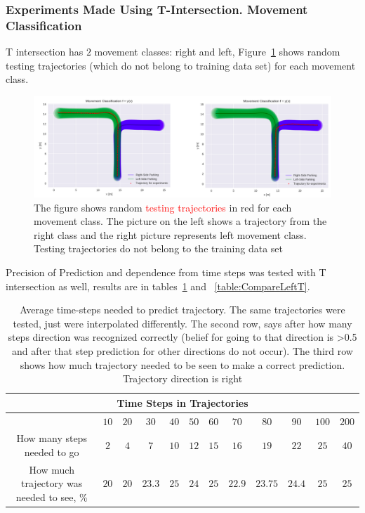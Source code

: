 \subsubsection{Experiments Made Using T-Intersection. Movement Classification}

T intersection has $2$ movement classes: right and left, Figure~\ref{fig:MovClassesT} shows random testing trajectories (which do not belong to training data set) for each movement class.

\begin{figure}[H]
	\centering  	
	\includegraphics[width=13cm]{img/rightleftT.png}
	\caption{The figure shows random \textcolor{red}{testing trajectories} in red for each movement class. The picture on the left shows a trajectory from the right class and the right picture represents left movement class. Testing trajectories do not belong to the training data set}
	\label{fig:MovClassesT}    
\end{figure}

Precision of Prediction and dependence from time steps was tested with T intersection as well, results are in tables~\ref{table:CompareRightT} and ~\ref{table:CompareLeftT}.

\begin{table}[h!]
	\centering
	\begin{tabular}{|c|c|c|c|c|c|c|c|c|c|c|c|} 
		\hline
		\multicolumn{12}{|c|}{Time Steps in Trajectories} \\
		\hline
		& $10$ & $20$ & $30$ & $40$ & $50$ & $60$ & $70$ & $80$ & $90$ & $100$ & $200$ \\ [0.5ex] 
		\hline\hline
		How many steps needed to go               & $2$  & $4$  & $7$    & $10$ & $12$ & $15$  &  $16$   & $19$     & $22$   & $25$ & $40$ \\ [1ex]
		How much trajectory was needed to see, \% & $20$ & $20$ & $23.3$ & $25$  & $24$ & $25$ & $22.9$ & $23.75$  & $24.4$ & $25$ & $25$ \\ [1ex]
		\hline
	\end{tabular}
	\caption{Average time-steps needed to predict trajectory. The same trajectories were tested, just were interpolated differently. The second row, says after how many steps direction was recognized correctly (belief for going to that direction is >0.5 and after that step prediction for other directions do not occur). The third row shows how much trajectory needed to be seen to make a correct prediction. Trajectory direction is right}
	\label{table:CompareRightT}
\end{table}

